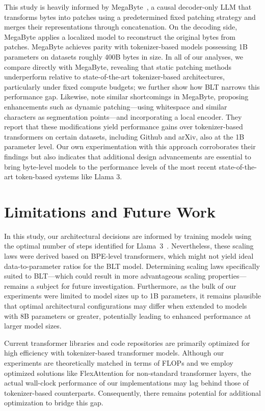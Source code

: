 This study is heavily informed by MegaByte~\citep{yu2023megabyte}, a causal decoder-only LLM that transforms bytes into patches using a predetermined fixed patching strategy and merges their representations through concatenation. On the decoding side, MegaByte applies a localized model to reconstruct the original bytes from patches. MegaByte achieves parity with tokenizer-based models possessing 1B parameters on datasets roughly 400B bytes in size. In all of our analyses, we compare directly with MegaByte, revealing that static patching methods underperform relative to state-of-the-art tokenizer-based architectures, particularly under fixed compute budgets; we further show how {\textsc BLT} narrows this performance gap. Likewise, \cite{slagle2024spacebyte} note similar shortcomings in MegaByte, proposing enhancements such as dynamic patching—using whitespace and similar characters as segmentation points—and incorporating a local encoder. They report that these modifications yield performance gains over tokenizer-based transformers on certain datasets, including Github and arXiv, also at the 1B parameter level. Our own experimentation with this approach corroborates their findings but also indicates that additional design advancements are essential to bring byte-level models to the performance levels of the most recent state-of-the-art token-based systems like Llama 3.

\section{Limitations and Future Work}

In this study, our architectural decisions are informed by training models using the optimal number of steps identified for Llama~3~\citep{dubey2024llama}. Nevertheless, these scaling laws were derived based on BPE-level transformers, which might not yield ideal data-to-parameter ratios for the {\textsc BLT} model. Determining scaling laws specifically suited to {\textsc BLT}—which could result in more advantageous scaling properties—remains a subject for future investigation. Furthermore, as the bulk of our experiments were limited to model sizes up to 1B parameters, it remains plausible that optimal architectural configurations may differ when extended to models with 8B parameters or greater, potentially leading to enhanced performance at larger model sizes.

Current transformer libraries and code repositories are primarily optimized for high efficiency with tokenizer-based transformer models. Although our experiments are theoretically matched in terms of FLOPs and we employ optimized solutions like FlexAttention for non-standard transformer layers, the actual wall-clock performance of our implementations may lag behind those of tokenizer-based counterparts. Consequently, there remains potential for additional optimization to bridge this gap.

